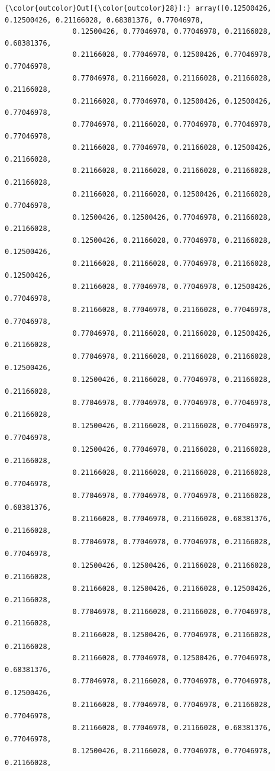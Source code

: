 \documentclass[11pt]{article}
\begin{document}
\begin{Verbatim}[commandchars=\\\{\}]
{\color{outcolor}Out[{\color{outcolor}28}]:} array([0.12500426, 0.12500426, 0.21166028, 0.68381376, 0.77046978,
                0.12500426, 0.77046978, 0.77046978, 0.21166028, 0.68381376,
                0.21166028, 0.77046978, 0.12500426, 0.77046978, 0.77046978,
                0.77046978, 0.21166028, 0.21166028, 0.21166028, 0.21166028,
                0.21166028, 0.77046978, 0.12500426, 0.12500426, 0.77046978,
                0.77046978, 0.21166028, 0.77046978, 0.77046978, 0.77046978,
                0.21166028, 0.77046978, 0.21166028, 0.12500426, 0.21166028,
                0.21166028, 0.21166028, 0.21166028, 0.21166028, 0.21166028,
                0.21166028, 0.21166028, 0.12500426, 0.21166028, 0.77046978,
                0.12500426, 0.12500426, 0.77046978, 0.21166028, 0.21166028,
                0.12500426, 0.21166028, 0.77046978, 0.21166028, 0.12500426,
                0.21166028, 0.21166028, 0.77046978, 0.21166028, 0.12500426,
                0.21166028, 0.77046978, 0.77046978, 0.12500426, 0.77046978,
                0.21166028, 0.77046978, 0.21166028, 0.77046978, 0.77046978,
                0.77046978, 0.21166028, 0.21166028, 0.12500426, 0.21166028,
                0.77046978, 0.21166028, 0.21166028, 0.21166028, 0.12500426,
                0.12500426, 0.21166028, 0.77046978, 0.21166028, 0.21166028,
                0.77046978, 0.77046978, 0.77046978, 0.77046978, 0.21166028,
                0.12500426, 0.21166028, 0.21166028, 0.77046978, 0.77046978,
                0.12500426, 0.77046978, 0.21166028, 0.21166028, 0.21166028,
                0.21166028, 0.21166028, 0.21166028, 0.21166028, 0.77046978,
                0.77046978, 0.77046978, 0.77046978, 0.21166028, 0.68381376,
                0.21166028, 0.77046978, 0.21166028, 0.68381376, 0.21166028,
                0.77046978, 0.77046978, 0.77046978, 0.21166028, 0.77046978,
                0.12500426, 0.12500426, 0.21166028, 0.21166028, 0.21166028,
                0.21166028, 0.12500426, 0.21166028, 0.12500426, 0.21166028,
                0.77046978, 0.21166028, 0.21166028, 0.77046978, 0.21166028,
                0.21166028, 0.12500426, 0.77046978, 0.21166028, 0.21166028,
                0.21166028, 0.77046978, 0.12500426, 0.77046978, 0.68381376,
                0.77046978, 0.21166028, 0.77046978, 0.77046978, 0.12500426,
                0.21166028, 0.77046978, 0.77046978, 0.21166028, 0.77046978,
                0.21166028, 0.77046978, 0.21166028, 0.68381376, 0.77046978,
                0.12500426, 0.21166028, 0.77046978, 0.77046978, 0.21166028,

\end{Verbatim}
\end{document}
